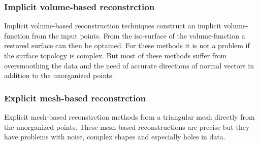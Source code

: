 \subsubsection{Implicit volume-based reconstrction}
Implicit volume-based reconstruction techniques construct an implicit
volume-function from the input points. From the iso-surface of the
volume-function a restored surface can then be optained. For these methods it is
not a problem if the surface topology is complex. But most of these methods
suffer from oversmoothing the data and the need of accurate directions of normal
vectors in addition to the unorganized points. 
\subsubsection{Explicit mesh-based reconstrction}
Explicit mesh-based reconstrction methods form a triangular mesh directly from
the unorganized points. These mesh-based reconstructions are precise but they
have problems with noise, complex shapes and especially holes in data.







\endinput
